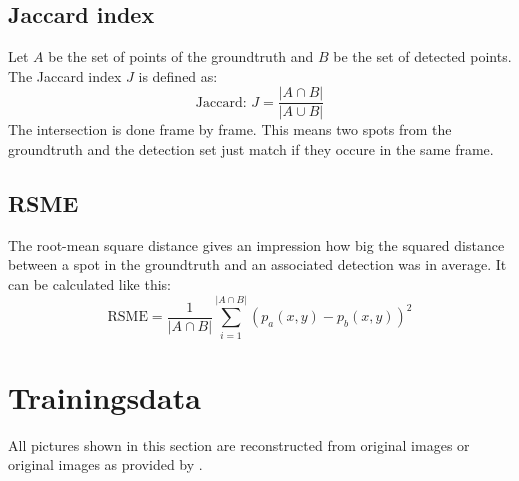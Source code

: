 \subsection{Jaccard index}
Let $A$ be the set of points of the groundtruth and $B$ be the set of detected points. The Jaccard index $J$ is defined as:
\begin{equation}
\text{Jaccard: }J = \frac{\left|A\cap B\right|}{\left|A\cup B\right|}
\end{equation}
The intersection is done frame by frame. This means two spots from the groundtruth and the detection set just match if they occure in the same frame. 
\subsection{RSME}
The root-mean square distance gives an impression how big the squared distance between a spot in the groundtruth and an associated detection was in average. It can be calculated like this:
\begin{equation}
\text{RSME} = \frac{1}{\left|A\cap B\right|}\sum\limits_{i=1}^{\left|A\cap B\right|} \left(p_a(x,y)-p_b(x,y)\right)^2
\end{equation}
\section{Trainingsdata}
All pictures shown in this section are reconstructed from original images or original images as provided by \cite{challenge}.
